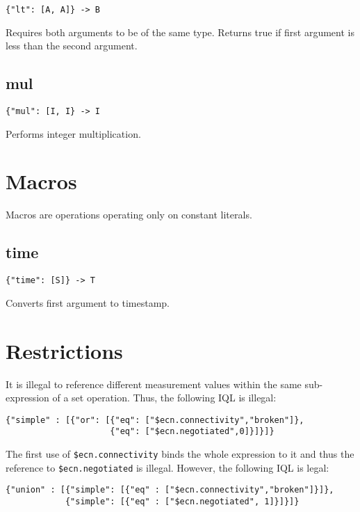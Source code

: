 \documentclass[12pt]{article}
\begin{document}
\begin{verbatim}
{"lt": [A, A]} -> B
\end{verbatim}

Requires both arguments to be of the same type. Returns true if first argument is less than the second argument. 

\subsection{mul}

\begin{verbatim}
{"mul": [I, I} -> I
\end{verbatim}

Performs integer multiplication.

\section{Macros}

Macros are operations operating only on constant literals.

\subsection{time}

\begin{verbatim}
{"time": [S]} -> T
\end{verbatim}

Converts first argument to timestamp. 

\section{Restrictions}

It is illegal to reference different measurement values within the same sub-expression of a set operation. Thus, the following IQL is illegal:

\begin{verbatim}
{"simple" : [{"or": [{"eq": ["$ecn.connectivity","broken"]},
                     {"eq": ["$ecn.negotiated",0]}]}]}
\end{verbatim}

The first use of \verb|$ecn.connectivity| binds the whole expression to it and thus the reference to \verb|$ecn.negotiated| is illegal. However, the following
IQL is legal:

\begin{verbatim}
{"union" : [{"simple": [{"eq" : ["$ecn.connectivity","broken"]}]},
            {"simple": [{"eq" : ["$ecn.negotiated", 1]}]}]}
\end{verbatim}
\end{document}
